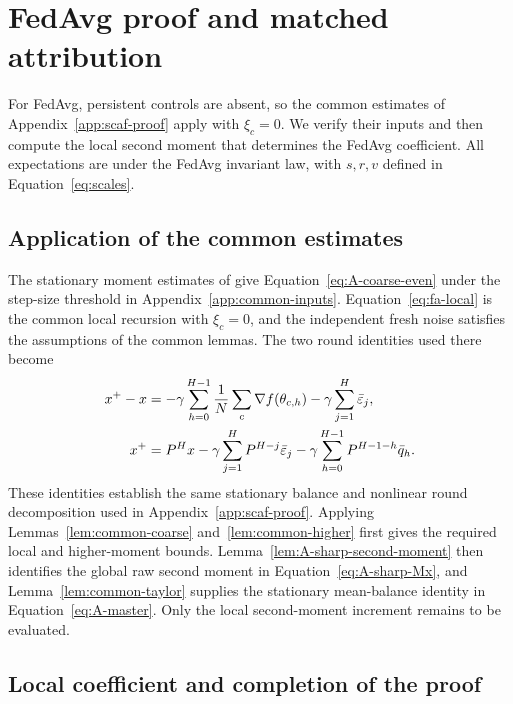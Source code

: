 \section{FedAvg proof and matched attribution}
\label{app:fa-proof}

For FedAvg, persistent controls are absent, so the common estimates of
Appendix~\ref{app:scaf-proof} apply with $\xi_c=0$. We verify their
inputs and then compute the local second moment that determines the FedAvg
coefficient. All expectations are under the FedAvg invariant law, with
$s,r,v$ defined in Equation~\eqref{eq:scales}.

\subsection{Application of the common estimates}

The stationary moment estimates of \citet[Proposition~3 and
Lemmas~5--6]{mangold2025fedavg} give
Equation~\eqref{eq:A-coarse-even} under the step-size threshold in
Appendix~\ref{app:common-inputs}. Equation~\eqref{eq:fa-local} is the
common local recursion with $\xi_c=0$, and the independent fresh noise
satisfies the assumptions of the common lemmas. The two round identities
used there become
\begin{align}
 x^+-x&=-\gamma\sum_{h=0}^{H-1}\frac1N\sum_c\nabla f(\theta_{c,h})
         -\gamma\sum_{j=1}^H\bar{\varepsilon}_j,
 \label{eq:B-global-increment}\\
 x^+&=P^Hx-\gamma\sum_{j=1}^HP^{H-j}\bar{\varepsilon}_j
             -\gamma\sum_{h=0}^{H-1}P^{H-1-h}\bar q_h.
 \label{eq:B-round-exact}
\end{align}
These identities establish the same stationary balance and nonlinear
round decomposition used in Appendix~\ref{app:scaf-proof}. Applying
Lemmas~\ref{lem:common-coarse} and~\ref{lem:common-higher} first gives
the required local and higher-moment bounds. Lemma~\ref{lem:A-sharp-second-moment}
then identifies the global raw second moment in Equation~\eqref{eq:A-sharp-Mx},
and Lemma~\ref{lem:common-taylor} supplies the stationary mean-balance
identity in Equation~\eqref{eq:A-master}. Only the local second-moment
increment remains to be evaluated.

\subsection{Local coefficient and completion of the proof}

